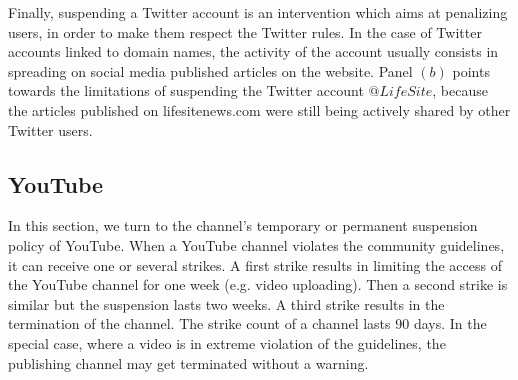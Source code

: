 \documentclass{article}
\begin{document}
Finally, suspending a Twitter account is an intervention which aims at penalizing users, in order to make them respect the Twitter rules. In the case of Twitter accounts linked to domain names, the activity of the account usually consists in spreading on social media published articles on the website. Panel $(b)$ points towards the limitations of suspending the Twitter account $@LifeSite$, because the 
articles published on lifesitenews.com were still being actively shared by other Twitter users.

\subsection{YouTube}

In this section, we turn to the channel's temporary or permanent suspension policy of YouTube. When a YouTube channel violates the community guidelines, it can receive one or several strikes.
A first strike results in limiting the access of the YouTube channel  for one week
(e.g. video uploading). 
Then a second strike is similar but the suspension lasts two weeks. 
A third strike results in the termination of the channel. The strike count of a channel lasts 90 days.  In the special case, where a video is in extreme violation of the guidelines, the publishing channel may get terminated without a warning. 

\smallskip
\end{document}
